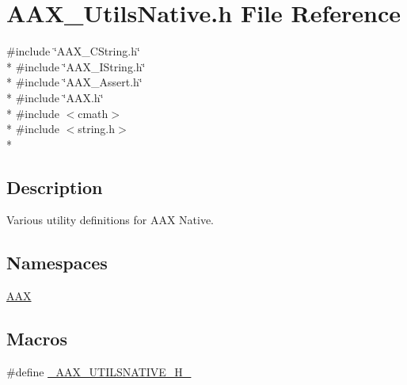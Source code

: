 \hypertarget{a00300}{}\section{A\+A\+X\+\_\+\+Utils\+Native.\+h File Reference}
\label{a00300}
{\ttfamily \#include \char`\"{}A\+A\+X\+\_\+\+C\+String.\+h\char`\"{}}\\*
{\ttfamily \#include \char`\"{}A\+A\+X\+\_\+\+I\+String.\+h\char`\"{}}\\*
{\ttfamily \#include \char`\"{}A\+A\+X\+\_\+\+Assert.\+h\char`\"{}}\\*
{\ttfamily \#include \char`\"{}A\+A\+X.\+h\char`\"{}}\\*
{\ttfamily \#include $<$cmath$>$}\\*
{\ttfamily \#include $<$string.\+h$>$}\\*


\subsection{Description}
Various utility definitions for A\+A\+X Native. 

\subsection*{Namespaces}
\begin{DoxyCompactItemize}
\item 
 \hyperlink{a00288}{A\+A\+X}
\end{DoxyCompactItemize}
\subsection*{Macros}
\begin{DoxyCompactItemize}
\item 
\#define \hyperlink{a00300_a965532f32e277e8db47e16180161827e}{\+\_\+\+A\+A\+X\+\_\+\+U\+T\+I\+L\+S\+N\+A\+T\+I\+V\+E\+\_\+\+H\+\_\+}
\end{DoxyCompactItemize}
